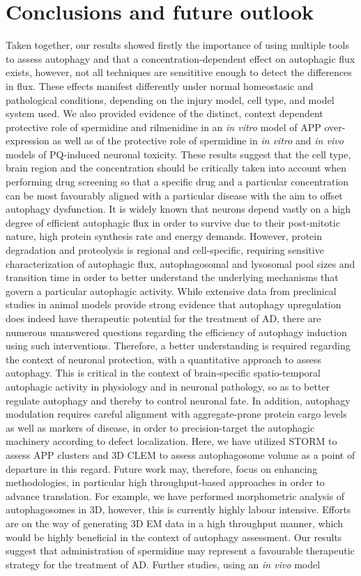 \section{Conclusions and future outlook}
Taken together, our results showed firstly the importance of using multiple tools to assess autophagy and that a concentration-dependent effect on autophagic flux exists, however, not all techniques are sensititive enough to detect the differences in flux. These effects manifest differently under normal homeostasic and pathological conditions, depending on the injury model, cell type, and model system used. We also provided evidence of the distinct, context dependent protective role of spermidine and rilmenidine in an \textit{in vitro} model of APP over-expression as well as of the protective role of spermidine in \textit{in vitro} and \textit{in vivo} models of PQ-induced neuronal toxicity. These results suggest that the cell type, brain region and the concentration should be critically taken into account when performing drug screening so that a specific drug and a particular concentration can be most favourably aligned with a particular disease with the aim to offset autophagy dysfunction. It is widely known that neurons depend vastly on a high degree of efficient autophagic flux in order to survive due to their post-mitotic nature, high protein synthesis rate and energy demands. However, protein degradation and proteolysis is regional and cell-specific, requiring sensitive characterization of autophagic flux, autophagosomal and lysosomal pool sizes and transition time  in order to better understand the underlying mechanisms that govern a particular autophagic activity. While extensive data from preclinical studies in animal models provide strong evidence that autophagy upregulation does indeed have therapeutic potential for the treatment of AD, there are numerous unanswered questions regarding the efficiency of autophagy induction using such interventions. Therefore, a better understanding is required regarding the context of neuronal protection, with a quantitative approach to assess autophagy. This is critical in the context of brain-specific spatio-temporal autophagic activity in physiology and in neuronal pathology, so as to better regulate autophagy and thereby to control neuronal fate. In addition, autophagy modulation requires careful alignment with aggregate-prone protein cargo levels as well as markers of disease, in order to precision-target the autophagic machinery according to defect localization. Here, we have utilized STORM to assess APP clusters and 3D CLEM to assess autophagosome volume as a point of departure in this regard. Future work may, therefore, focus on enhancing methodologies, in particular high throughput-based approaches in order to advance translation. For example, we have performed morphometric analysis of autophagosomes in 3D, however, this is currently highly labour intensive. Efforts are on the way of generating 3D EM data in a high throughput manner, which would be highly beneficial in the context of autophagy assessment. Our results suggest that administration of spermidine may represent a favourable therapeutic strategy for the treatment of AD. Further studies, using an \textit{in vivo} model 